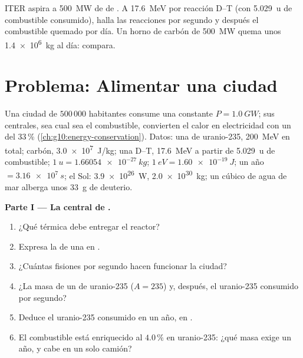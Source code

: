 \begin{exercise}[$\star\star\star$]\label{exo:g12:nuclear-energy:15}
ITER aspira a \qty{500}{MW} de  de . A \qty{17.6}{MeV} por reacción
D--T (con \qty{5.029}{u} de combustible consumido), halla las reacciones por segundo y
después el combustible quemado por día. Un horno de carbón de \qty{500}{MW} quema unos
\qty{1.4e6}{kg} al día: compara.
\end{exercise}

\section{Problema: Alimentar una ciudad}

\begin{problem}
\label{pb:g12:nuclear-energy:1}
Una ciudad de $500\,000$ habitantes consume una  constante
$P = \qty{1.0}{GW}$; sus centrales, sea cual sea el combustible, convierten el calor
en electricidad con un  del $33\,\%$
(\cref{ch:g10:energy-conservation}). Datos: una  de uranio-235, \qty{200}{MeV}
en total; carbón, \qty{3.0e7}{J/kg}; una  D--T, \qty{17.6}{MeV} a partir de
\qty{5.029}{u} de combustible; $\qty{1}{u} = \qty{1.66054e-27}{kg}$;
$\qty{1}{eV} = \qty{1.60e-19}{J}$; un año $= \qty{3.16e7}{s}$; el Sol:
\qty{3.9e26}{W}, \qty{2.0e30}{kg}; un  cúbico de agua de mar alberga unos
\qty{33}{g} de deuterio.

\medskip
\noindent\textbf{Parte I --- La central de .}
\begin{enumerate}
  \item ¿Qué  térmica debe entregar el reactor?
  \item Expresa la  de una  en .
  \item ¿Cuántas fisiones por segundo hacen funcionar la ciudad?
  \item ¿La masa de un  de uranio-235 ($A = 235$) y, después, el uranio-235
        consumido por segundo?
  \item Deduce el uranio-235 consumido en un año, en .
  \item El combustible está enriquecido al $4.0\,\%$ en uranio-235: ¿qué masa exige un
        año, y cabe en un solo camión?
\end{enumerate}


\end{problem}
